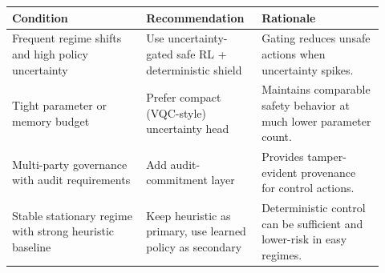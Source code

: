 \footnotesize
\setlength{\tabcolsep}{4pt}
\begin{tabular}{p{0.34\linewidth}p{0.27\linewidth}p{0.31\linewidth}}
\toprule
\textbf{Condition} & \textbf{Recommendation} & \textbf{Rationale} \\
\midrule
Frequent regime shifts and high policy uncertainty & Use uncertainty-gated safe RL + deterministic shield & Gating reduces unsafe actions when uncertainty spikes. \\
Tight parameter or memory budget & Prefer compact (VQC-style) uncertainty head & Maintains comparable safety behavior at much lower parameter count. \\
Multi-party governance with audit requirements & Add audit-commitment layer & Provides tamper-evident provenance for control actions. \\
Stable stationary regime with strong heuristic baseline & Keep heuristic as primary, use learned policy as secondary & Deterministic control can be sufficient and lower-risk in easy regimes. \\
\bottomrule
\end{tabular}

